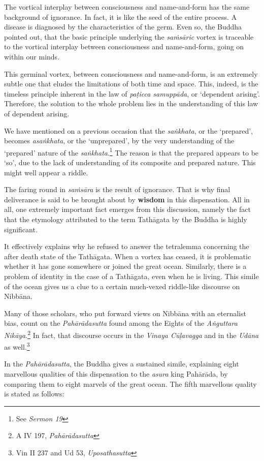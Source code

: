 The vortical interplay between consciousness and name-and-form has the same background of ignorance. In fact, it is like the seed of the entire process. A disease is diagnosed by the characteristics of the germ. Even so, the Buddha pointed out, that the basic principle underlying the \emph{saṁsāric} vortex is traceable to the vortical interplay between consciousness and name-and-form, going on within our minds.

This germinal vortex, between consciousness and name-and-form, is an extremely subtle one that eludes the limitations of both time and space. This, indeed, is the timeless principle inherent in the law of \emph{paṭicca samuppāda}, or `dependent arising'. Therefore, the solution to the whole problem lies in the understanding of this law of dependent arising.

We have mentioned on a previous occasion that the \emph{saṅkhata}, or the `prepared', becomes \emph{asaṅkhata}, or the `unprepared', by the very understanding of the `prepared' nature of the \emph{saṅkhata}.\footnote{See \emph{Sermon 19}} The reason is that the prepared appears to be `so', due to the lack of understanding of its composite and prepared nature. This might well appear a riddle.

The faring round in \emph{saṁsāra} is the result of ignorance. That is why final deliverance is said to be brought about by \textbf{wisdom} in this dispensation. All in all, one extremely important fact emerges from this discussion, namely the fact that the etymology attributed to the term Tathāgata by the Buddha is highly significant.

It effectively explains why he refused to answer the tetralemma concerning the after death state of the Tathāgata. When a vortex has ceased, it is problematic whether it has gone somewhere or joined the great ocean. Similarly, there is a problem of identity in the case of a Tathāgata, even when he is living. This simile of the ocean gives us a clue to a certain much-vexed riddle-like discourse on Nibbāna.

Many of those scholars, who put forward views on Nibbāna with an eternalist bias, count on the \emph{Pahārādasutta} found among the Eights of the \emph{Aṅguttara Nikāya}.\footnote{A IV 197, \emph{Pahārādasutta}} In fact, that discourse occurs in the \emph{Vinaya Cūḷavagga} and in the \emph{Udāna} as well.\footnote{Vin II 237 and Ud 53, \emph{Uposathasutta}}

In the \emph{Pahārādasutta}, the Buddha gives a sustained simile, explaining eight marvellous qualities of this dispensation to the \emph{asura} king Pahārāda, by comparing them to eight marvels of the great ocean. The fifth marvellous quality is stated as follows:

